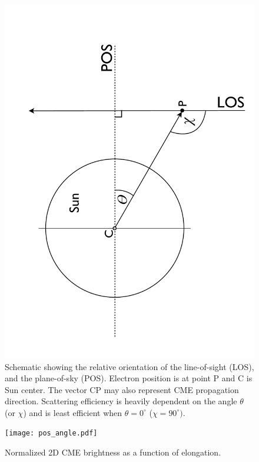 \begin{figure}[h!]
\includegraphics[trim = 0cm 0cm 0cm 0cm, scale=0.3, angle=270]{images/LOS_POS_2.pdf}
\caption[Line-of-sight and plane-of-sky orientations]{Schematic showing the relative orientation of the line-of-sight (LOS), and the plane-of-sky (POS). Electron position is at point P and C is 
Sun center. The vector CP may also represent CME propagation direction. Scattering efficiency is heavily dependent on the angle $\theta$ 
(or $\chi$) and is least efficient 
when $\theta = 0^{\circ}$ ($\chi=90^{\circ})$.}
\label{fig:LOS_POS_2}
\end{figure}


\begin{figure}[1t]
\begin{center}
\texttt{[image: pos\_angle.pdf]}
\caption[Electron brightness as function of angle]{Normalized 2D CME brightness as a function of elongation.}
\label{fig:pos_angle}
\end{center}
\end{figure}

